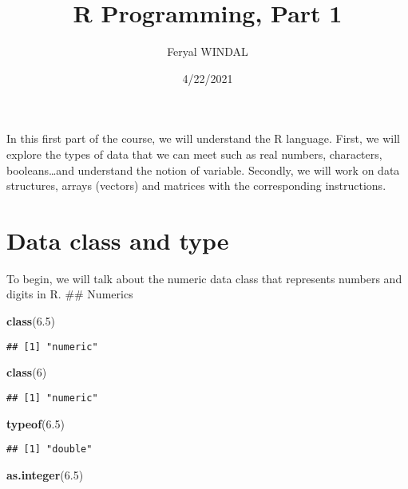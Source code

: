 \documentclass[
]{article}
\title{R Programming, Part 1}
\author{Feryal WINDAL}
\date{4/22/2021}
\newenvironment{Shaded}{\begin{snugshade}}{\end{snugshade}}
\newcommand{\DecValTok}[1]{\textcolor[rgb]{0.00,0.00,0.81}{#1}}
\newcommand{\FloatTok}[1]{\textcolor[rgb]{0.00,0.00,0.81}{#1}}
\newcommand{\FunctionTok}[1]{\textcolor[rgb]{0.13,0.29,0.53}{\textbf{#1}}}
\newcommand{\NormalTok}[1]{#1}
\begin{document}
\maketitle

In this first part of the course, we will understand the R language.
First, we will explore the types of data that we can meet such as real
numbers, characters, booleans\ldots and understand the notion of
variable. Secondly, we will work on data structures, arrays (vectors)
and matrices with the corresponding instructions.

\hypertarget{data-class-and-type}{%
\section{Data class and type}\label{data-class-and-type}}

To begin, we will talk about the numeric data class that represents
numbers and digits in R. \#\# Numerics

\begin{Shaded}
\begin{Highlighting}[]
\FunctionTok{class}\NormalTok{(}\FloatTok{6.5}\NormalTok{)}
\end{Highlighting}
\end{Shaded}

\begin{verbatim}
## [1] "numeric"
\end{verbatim}

\begin{Shaded}
\begin{Highlighting}[]
\FunctionTok{class}\NormalTok{(}\DecValTok{6}\NormalTok{)}
\end{Highlighting}
\end{Shaded}

\begin{verbatim}
## [1] "numeric"
\end{verbatim}

\begin{Shaded}
\begin{Highlighting}[]
\FunctionTok{typeof}\NormalTok{(}\FloatTok{6.5}\NormalTok{)}
\end{Highlighting}
\end{Shaded}

\begin{verbatim}
## [1] "double"
\end{verbatim}

\begin{Shaded}
\begin{Highlighting}[]
\FunctionTok{as.integer}\NormalTok{(}\FloatTok{6.5}\NormalTok{)}
\end{Highlighting}
\end{Shaded}
\end{document}
